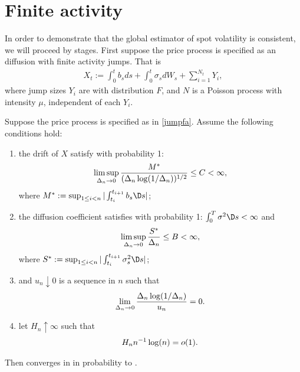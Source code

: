 \section{Finite activity}
In order to demonstrate that the global estimator of spot volatility is consistent, we will proceed by stages.  First suppose the price process is specified  as an \ito diffusion with  finite activity jumps.  That is 
\begin{align}
  X_t :=  \int_0^t b_s d s + \int_0^t \sigma_s dW_s +  \sum^{N_t}_{ i = 1} Y_i,
  \label{jumpfa}
\end{align}
where jump sizes $Y_i$ are \iid with distribution $F$, and $N$ is a Poisson process with intensity $\mu$, independent of each $Y_i$.

\begin{prop}\label{pro:finite}
  Suppose the  price process is specified as in \eqref{jumpfa}.  Assume the following conditions hold:
  \begin{enumerate}[label=\emph{(}\roman*\emph{)}]
    \item 
  the drift of $X$ satisfy with probability 1:
  \begin{align}
    \limsup_{\Delta_n \to 0} \frac{M^*}{(\Delta_n \log(1/\Delta_n))^{1/2}} \le  C< \infty, \notag
    \label{}
  \end{align}
where $M^* : = \sup_{1 \le i <n} \vert \int^{t_{i+1}}_{t_i} b_s \D s\vert$;
\item the diffusion coefficient satisfies with probability 1:  $\int^T_0 \sigma^2 \D s < \infty$ and 
  \begin{align}
\limsup_{\Delta_n \to 0} \frac{S^*}{\Delta_n} \le B <\infty, \notag
    \label{}
  \end{align}
  where $S^* := \sup_{1 \le i <n} \vert \int^{t_{i+1}}_{t_i} \sigma^2_s \D s\vert$;
\item and   $u_n \downarrow 0 $ is a sequence in $n$ such that  
\begin{align}
    \lim_{\Delta_n \to 0} \frac{\Delta_n \log (1/\Delta_n)}{u_n} = 0.\notag
    \label{}
  \end{align}
\item let $H_n \uparrow \infty$ such that 
  \begin{align}
    H_n n^{-1} \log(n) = o(1).\notag
    \label{}
  \end{align}
  \end{enumerate}
  Then
  \jvn converges in \Ltwo in probability to \sv.
\end{prop}
